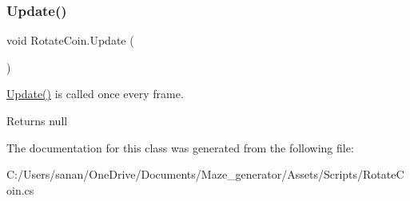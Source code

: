 \subsubsection{\texorpdfstring{Update()}{Update()}}
{\footnotesize\ttfamily void Rotate\+Coin.\+Update (\begin{DoxyParamCaption}{ }\end{DoxyParamCaption})\hspace{0.3cm}{\ttfamily [private]}}



\mbox{\hyperlink{class_rotate_coin_a5d9d210187f1beb0d908850a72ebf7df}{Update()}} is called once every frame. 

\begin{DoxyReturn}{Returns}
null 
\end{DoxyReturn}


The documentation for this class was generated from the following file\+:\begin{DoxyCompactItemize}
\item 
C\+:/\+Users/sanan/\+One\+Drive/\+Documents/\+Maze\+\_\+generator/\+Assets/\+Scripts/Rotate\+Coin.\+cs\end{DoxyCompactItemize}
